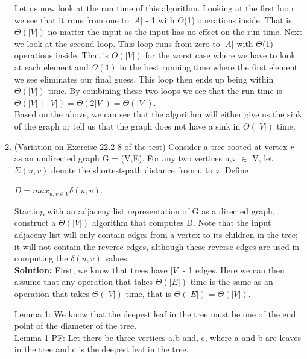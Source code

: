 \documentclass[11pt]{article}
\begin{document}
\begin{enumerate}
Let us now look at the run time of this algorithm. Looking at the first loop we see that it runs from one to $|A|$ - 1 with $\Theta$(1) operations inside. That is $\Theta(|V|)$ no matter the input as the input has no effect on the run time. Next we look at the second loop. This loop runs from zero to $|A|$ with $\Theta$(1) operations inside. That is $O(|V|)$ for the worst case where we have to look at each element and $\Omega(1)$ in the best running time where the first element we see eliminates our final guess. This loop then ends up being within $\Theta(|V|)$ time. By combining these two loops we see that the run time is $\Theta(|V|+|V|) = \Theta(2|V|) = \Theta(|V|)$.\\

Based on the above, we can see that the algorithm will either give us the sink of the graph or tell us that the graph does not have a sink in $\Theta(|V|)$ time.\\

\item (Variation on Exercise 22.2-8 of the test) Consider a tree rooted at vertex $r$ as an undirected graph G = (V,E). For any two vertices u,v $\in$ V, let $\Sigma(u,v)$ denote the shortest-path distance from u to v. Define

$D = max_{u,v\in V}\delta(u,v)$.

Starting with an adjaceny list representation of G as a directed graph, construct a $\Theta(|V|)$ algorithm that computes D. Note that the input adjaceny list will only contain edges from a vertex to its children in the tree; it will not contain the reverse edges, although these reverse edges are used in computing the $\delta(u,v)$ values.\\

\textbf{Solution:} First, we know that trees have $|V|$ - 1 edges. Here we can then assume that any operation that takes $\Theta(|E|)$ time is the same as an operation that takes $\Theta(|V|)$ time, that is $\Theta(|E|) = \Theta(|V|)$.

Lemma 1: We know that the deepest leaf in the tree must be one of the end point of the diameter of the tree.\\
Lemma 1 PF: Let there be three vertices a,b and, c, where a and b are leaves in the tree and c is the deepest leaf in the tree.
    

\end{enumerate}
\end{document}
